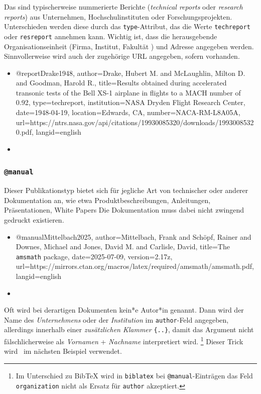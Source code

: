 Das sind typischerweise nummerierte Berichte (\emph{technical reports} oder
\emph{research reports}) aus Unternehmen, Hochschulinstituten oder
Forschungsprojekten. Unterschieden werden diese durch das
\texttt{type}-Attribut, das die Werte \texttt{techreport} oder
\texttt{resreport} annehmen kann. Wichtig ist, dass die herausgebende
Organisationseinheit (Firma, Institut, Fakultät \etc) und Adresse angegeben
werden. Sinnvollerweise wird auch der zugehörige URL angegeben, sofern
vorhanden.
%
\begin{itemize}
\item[]
\begin{GenericCode}[numbers=none]
@report{Drake1948,
  author={Drake, Hubert M. and McLaughlin, Milton D. and Goodman, Harold R.},
  title={Results obtained during accelerated transonic tests of the {Bell} {XS-1} airplane in flights to a {MACH} number of 0.92},
  type={techreport},
  institution={NASA Dryden Flight Research Center},
  date={1948-04-19},
  location={Edwards, CA},
  number={NACA-RM-L8A05A},
  url={https://ntrs.nasa.gov/api/citations/19930085320/downloads/19930085320.pdf},
  langid={english}
}
\end{GenericCode}
\item[\cite{Drake1948}] 
\end{itemize}


\subsubsection{\texttt{\bfseries @manual}}
\label{sec:@manual}

Dieser Publikationstyp bietet sich für jegliche Art von technischer oder anderer
Dokumentation an, wie etwa Produktbeschreibungen, Anleitungen,
Präsentationen, White Papers \usw Die Dokumentation muss dabei nicht zwingend
gedruckt existieren.
%
\begin{itemize}
\item[]
\begin{GenericCode}[numbers=none]
@manual{Mittelbach2025,
  author={Mittelbach, Frank and Schöpf, Rainer and Downes, Michael and Jones, David M. and Carlisle, David},
  title={The \texttt{amsmath} package},
  date={2025-07-09},
  version={2.17z},
  url={https://mirrors.ctan.org/macros/latex/required/amsmath/amsmath.pdf},
  langid={english}
}
\end{GenericCode}
\item[\cite{Mittelbach2025}] 
\end{itemize}
%
Oft wird bei derartigen Dokumenten kein*e Autor*in genannt. Dann wird der
Name des \emph{Unternehmens} oder der \emph{Institution} im
\texttt{author}-Feld angegeben, allerdings innerhalb einer
\emph{zusätzlichen Klammer} \texttt{\{..\}}, damit das Argument nicht
fälschlicherweise als \emph{Vornamen} + \emph{Nachname} interpretiert wird.%
\footnote{Im Unterschied zu BibTeX wird in \texttt{biblatex} bei
\texttt{@manual}-Einträgen das Feld \texttt{organization} nicht als Ersatz
für \texttt{author} akzeptiert.} Dieser Trick wird \ua\ im nächsten Beispiel
verwendet.

